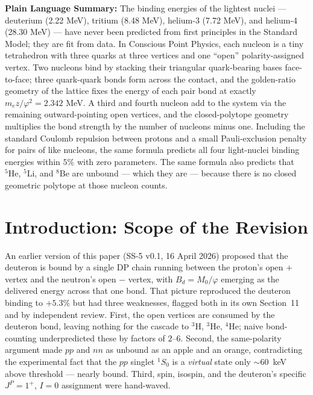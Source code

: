 \documentclass[11pt,letterpaper]{article}
\newcommand{\phig}{\varphi}
\newcommand{\Mzero}{M_0}
\newcommand{\Bd}{B_{d}}
\begin{document}
\bigskip\noindent
\textbf{Plain Language Summary:}
The binding energies of the lightest nuclei --- deuterium (2.22 MeV), tritium (8.48 MeV), helium-3 (7.72 MeV), and helium-4 (28.30 MeV) --- have never been predicted from first principles in the Standard Model; they are fit from data. In Conscious Point Physics, each nucleon is a tiny tetrahedron with three quarks at three vertices and one ``open'' polarity-assigned vertex. Two nucleons bind by stacking their triangular quark-bearing bases face-to-face; three quark-quark bonds form across the contact, and the golden-ratio geometry of the lattice fixes the energy of each pair bond at exactly $m_e z/\phig^2 = 2.342$ MeV. A third and fourth nucleon add to the system via the remaining outward-pointing open vertices, and the closed-polytope geometry multiplies the bond strength by the number of nucleons minus one. Including the standard Coulomb repulsion between protons and a small Pauli-exclusion penalty for pairs of like nucleons, the same formula predicts all four light-nuclei binding energies within $5\%$ with zero parameters. The same formula also predicts that ${}^{5}\mathrm{He}$, ${}^{5}\mathrm{Li}$, and ${}^{8}\mathrm{Be}$ are unbound --- which they are --- because there is no closed geometric polytope at those nucleon counts.

\bigskip
\raggedright
\tableofcontents
\newpage

\section{Introduction: Scope of the Revision}
\label{sec:intro}

An earlier version of this paper (SS-5 v0.1, 16 April 2026) proposed that the deuteron is bound by a single DP chain running between the proton's open $+$ vertex and the neutron's open $-$ vertex, with $\Bd = \Mzero/\phig$ emerging as the delivered energy across that one bond. That picture reproduced the deuteron binding to $+5.3\%$ but had three weaknesses, flagged both in its own Section~11 and by independent review. First, the open vertices are consumed by the deuteron bond, leaving nothing for the cascade to ${}^{3}\mathrm{H}$, ${}^{3}\mathrm{He}$, ${}^{4}\mathrm{He}$; naive bond-counting underpredicted these by factors of $2$--$6$. Second, the same-polarity argument made $pp$ and $nn$ as unbound as an apple and an orange, contradicting the experimental fact that the $pp$ singlet ${}^{1}S_{0}$ is a \emph{virtual} state only $\sim 60$~keV above threshold --- nearly bound. Third, spin, isospin, and the deuteron's specific $J^P = 1^+$, $I = 0$ assignment were hand-waved.
\end{document}
